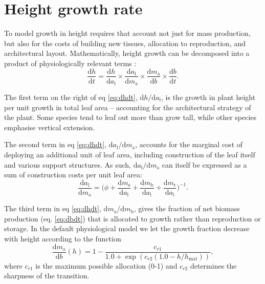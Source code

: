 \documentclass[10pt,twoside]{article}
\begin{document}
\section{Height growth rate}\label{height-growth-rate}

To model growth in height requires that account not just for mass
production, but also for the costs of building new tissues, allocation
to reproduction, and architectural layout. Mathematically, height growth
can be decomposed into a product of physiologically relevant terms
\citep{Falster-2011}:
\begin{equation} \label{eq:dhdt}
\frac{\textrm{d}h}{\textrm{d}t}= \frac{\textrm{d}h}{\textrm{d}a_\textrm{l}}
\times \frac{\textrm{d}a_\textrm{l}}{\textrm{d}m_\textrm{a}}
\times \frac{\textrm{d}m_\textrm{a}}{\textrm{d}b}
\times \frac{\textrm{d}b}{\textrm{d}t}.
\end{equation}

The first term on the right of eq \ref{eq:dhdt},
\(\textrm{d}h / \textrm{d}a_\textrm{l}\), is the growth in plant height
per unit growth in total leaf area -- accounting for the architectural
strategy of the plant. Some species tend to leaf out more than grow
tall, while other species emphasise vertical extension.

The second term in eq \ref{eq:dhdt},
\(\textrm{d}a_\textrm{l} / \textrm{d}m_\textrm{a}\), accounts for the
marginal cost of deploying an additional unit of leaf area, including
construction of the leaf itself and various support structures. As such,
\(\textrm{d}a_\textrm{l} / \textrm{d}m_\textrm{a}\) can itself be
expressed as a sum of construction costs per unit leaf area:
\begin{equation}\label{eq:daldmt}
\frac{\textrm{d}a_\textrm{l}}{\textrm{d}m_\textrm{a}}
= \big(\phi
 + \frac{\textrm{d}m_\textrm{s}}{\textrm{d}a_\textrm{l}} + \frac{\textrm{d}m_\textrm{b}}{\textrm{d}a_\textrm{l}} + \frac{\textrm{d}m_\textrm{r}}{\textrm{d}a_\textrm{l}}\big)^{-1}.
\end{equation}

The third term in eq \ref{eq:dhdt},
\(\textrm{d}m_\textrm{a} / \textrm{d}m_\textrm{b}\), gives the fraction
of net biomass production (eq. \ref{eq:dbdt}) that is allocated to
growth rather than reproduction or storage. In the default physiological model
we let the growth fraction decrease with height according to the function
\begin{equation}\label{eq:allocation}
\frac{\textrm{d}m_\textrm{a}}{\textrm{d}b}(h) = 1 - 
 \frac{c_{r1}} {1.0 + \exp\left(c_{r2}  \left(1.0 - h / h_\textrm{mat}\right)\right)},
\end{equation}
where $c_{r1}$ is the maximum possible allocation (0-1) and $c_{r2}$
determines the sharpness of the transition.
\end{document}
